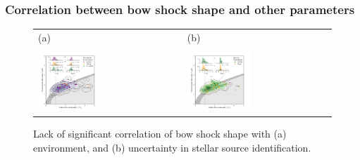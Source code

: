
\subsubsection{Correlation between bow shock shape and other parameters}
\label{sec:corr-shape}

\begin{figure}
  \centering
  \begin{tabular}{ll}
    (a) & (b) \\
    \includegraphics[width=0.45\textwidth]{figs/mipsgal-Rc-R90-environment} &
    \includegraphics[width=0.45\textwidth]{figs/mipsgal-Rc-R90-candidates} 
  \end{tabular}
  \caption[]{Lack of significant correlation of bow shock shape with
    (a) environment, and (b) uncertainty in stellar source
    identification.}
  \label{fig:mipsgal-uncorrelated}
\end{figure}

